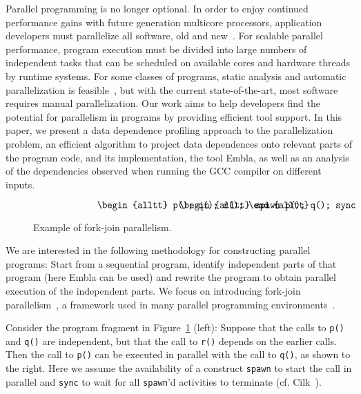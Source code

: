 \documentclass[times, 10pt,twocolumn]{article}
\begin{document}
Parallel programming is no longer optional.  In order to enjoy continued
performance gains with future generation multicore processors,
application developers must parallelize all software, old and
new~\cite{TEL95,ONHWC96,KAB03,VIAVAC05}.  For scalable parallel
performance, program execution must be divided into large numbers of
independent tasks that can be scheduled on available cores and hardware
threads by runtime systems.  For some classes of programs, static
analysis and automatic parallelization is feasible~\cite{KA02}, but with
the current state-of-the-art, most software requires manual
parallelization.  Our work aims to help developers find the potential
for parallelism in programs by providing efficient tool
support.  In this paper, we present a data dependence profiling approach
to the parallelization problem, an efficient algorithm to project data
dependences onto relevant parts of the program code, and its
implementation, the tool Embla, as well as an analysis of the dependencies 
observed when running the GCC compiler on different inputs.

\begin{figure}
\small
\hrulefill
\[
\begin{minipage}[t]{3cm}
\begin{alltt}
   p();
   q();
   r();
\end{alltt}
\end{minipage}
\begin{minipage}[t]{3cm}
\begin{alltt}
   spawn p();
   q();
   sync;
   r();
\end{alltt}
\end{minipage} 
\]
\hrulefill
\caption{Example of fork-join parallelism.}
\label{fforkjoin}
\end{figure}

We are interested in the following methodology for constructing
parallel programs: Start from a sequential program, identify
independent parts of that program (here Embla can be used) and rewrite
the program to obtain parallel execution of the independent parts.
We focus on introducing
fork-join parallelism~\cite{Conway63}, a framework used
in many parallel programming environments~\cite{BJKLR96, Lea00, DM98, LF00}.

Consider the program fragment in
Figure~\ref{fforkjoin} (left):
Suppose that the calls to {\tt p()} and {\tt q()} are independent,
but that the call to {\tt r()} depends on the earlier calls. Then
the call to {\tt p()} can be
executed in parallel with
the call to {\tt q()}, as shown to the right.
Here we assume the availability of a construct {\tt spawn} to start
the call in parallel and {\tt sync} to wait for all {\tt spawn}'d
activities to terminate (cf. Cilk~\cite{BJKLR96}).
\end{document}
